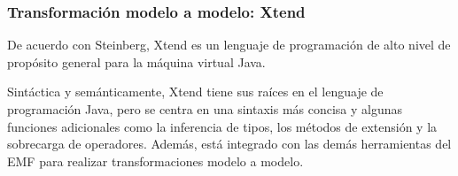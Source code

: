 \subsubsection*{Transformación modelo a modelo: Xtend}
De acuerdo con Steinberg\cite{steinberg_emf_2008}, Xtend es un lenguaje de programación de alto nivel de propósito general para la máquina virtual Java.


Sintáctica y semánticamente, Xtend tiene sus raíces en el lenguaje de programación Java, pero se centra en una sintaxis más concisa y algunas funciones adicionales como la inferencia de tipos, los métodos de extensión y la sobrecarga de operadores. Además, está integrado con las demás herramientas del EMF para realizar transformaciones modelo a modelo.


